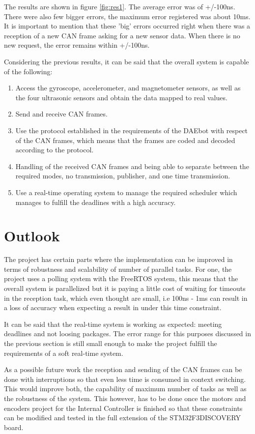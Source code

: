\documentclass[12pt]{report}%
\begin{document}
The results are shown in figure \ref{fig:res1}. The average error was of +/-100ns. There were also few bigger errors, the maximum error registered was about 10ms. It is important to mention that these 'big' errors occurred right when there was a reception of a new CAN frame asking for a new sensor data. When there is no new request, the error remains within +/-100ns.

Considering the previous results, it can be said that the overall system is capable of the following:

\begin{enumerate}
\item Access the gyroscope, accelerometer, and magnetometer sensors, as well as the four ultrasonic sensors and obtain the data mapped to real values.
\item Send and receive CAN frames.
\item Use the protocol established in the requirements of the DAEbot with respect of the CAN frames, which means that the frames are coded and decoded according to the protocol.
\item Handling of the received CAN frames and being able to separate between the required modes, no transmission, publisher, and one time transmission.
\item Use a real-time operating system to manage the required scheduler which manages to fulfill the deadlines with a high accuracy.
\end{enumerate}

\section{Outlook}
The project has certain parts where the implementation can be improved in terms of robustness and scalability of number of parallel tasks. For one, the project uses a polling system with the FreeRTOS system, this means that the overall system is parallelized but it is paying a little cost of waiting for timeouts in the reception task, which even thought are small, i.e 100ns - 1ms can result in a loss of accuracy when expecting a result in under this time constraint.

It can be said that the real-time system is working as expected: meeting deadlines and not loosing packages. The error range for this purposes discussed in the previous section is still small enough to make the project fulfill the requirements of a soft real-time system.

As a possible future work the reception and sending of the CAN frames can be done with interruptions so that even less time is consumed in context switching. This would improve both, the capability of maximum number of tasks as well as the robustness of the system. This however, has to be done once the motors and encoders project for the Internal Controller is finished so that these constraints can be modified and tested in the full extension of the STM32F3DISCOVERY board.
\end{document}
